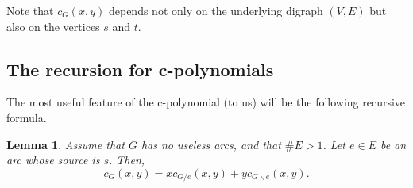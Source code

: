 \documentclass[12pt]{amsart}
\newtheorem{lemma}[theorem]{Lemma}
\theoremstyle{definition}
\begin{document}
Note that $c_{G}\left(  x,y\right)  $ depends not only on the underlying
digraph $\left(  V,E\right)  $ but also on the vertices $s$ and $t$.

\subsection{The recursion for c-polynomials}

The most useful feature of the c-polynomial (to us) will be the following
recursive formula.

\begin{lemma}
\label{lem.cpol.rec}Assume that $G$ has no useless arcs, and that $\#E>1$.
Let $e\in E$ be an arc whose source is $s$. Then,%
\[
c_{G}\left(  x,y\right)  =xc_{G/e}\left(  x,y\right)  +yc_{G\backslash
e}\left(  x,y\right)  .
\]

\end{lemma}
\end{document}
